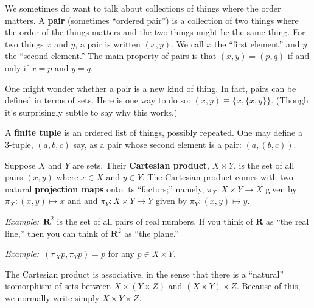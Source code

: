 \documentclass[12pt, a4paper]{article}
\newcommand{\defn}[1]{\textbf{#1}}
\newcommand{\set}[1]{\mathbold{#1}}
\newcommand{\eg}{\emph{Example:}\relax}
\begin{document}
We sometimes do want to talk about collections of things where the
order matters. A \defn{pair} (sometimes “ordered pair”) is a
collection of two things where the order of the things matters and the
two things might be the same thing. For two things $x$ and $y$, a pair
is written $(x, y)$. We call $x$ the “first element” and $y$ the
“second element.” The main property of pairs is that $(x,y)=(p,q)$ if
and only if $x=p$ and $y=q$.

One might wonder whether a pair is a new kind of thing. In fact, pairs
can be defined in terms of sets. Here is one way to do so: $(x, y)\equiv
\{x, \{x,y\}\}$. (Though it's surprisingly subtle to say why this works.)

A \defn{finite tuple} is an ordered list of things, possibly
repeated. One may define a 3-tuple, $(a, b, c)$ say, as a pair whose
second element is a pair: $(a, (b, c))$.
  
Suppose $X$ and $Y$ are sets. Their \defn{Cartesian product}, $X \times Y$,
is the set of all pairs $(x, y)$ where $x \in X$ and $y \in Y$. The
Cartesian product comes with two natural \defn{projection maps} onto
its ``factors;'' namely, $\pi_X\colon X \times Y \to X$ given by $\pi_X\colon
(x,y)\mapsto x$ and and $\pi_Y\colon X \times Y \to Y$ given by $\pi_Y\colon (x,y)\mapsto y$.

\eg\ $\set{R}^2$ is the set of all pairs of real numbers. If you think
of $\set{R}$ as ``the real line,'' then you can think of $\set{R}^2$
as ``the plane.''

\eg\ $(\pi_X p, \pi_Y p) = p$ for any $p \in X \times Y$.

The Cartesian product is associative, in the sense that there is a
``natural'' isomorphism of sets between $X \times (Y \times Z)$ and $(X \times Y) \times
Z$. Because of this, we normally write simply $X \times Y \times Z$.
\end{document}
